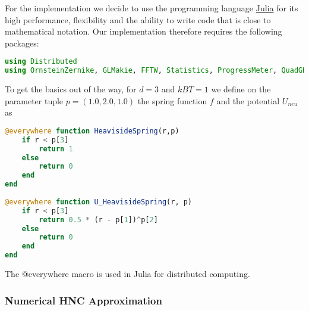 For the implementation we decide to use the programming language \href{https://julialang.org/}{Julia} for its high performance, flexibility and the ability to write code that is close to mathematical notation. Our implementation therefore requires the following packages:
\begin{mdframed}[backgroundcolor=black!4, topline=false, bottomline=false, rightline=false, leftline=false]
    \begin{lstlisting}[language=Julia,basicstyle=\small]
using Distributed
using OrnsteinZernike, GLMakie, FFTW, Statistics, ProgressMeter, QuadGK, NLsolve, ForwardDiff, LinearAlgebra, LoopVectorization, Base.Threads, CSV, DataFrames
    \end{lstlisting}
\end{mdframed}

To get the basics out of the way, for $d = 3$ and $kBT = 1$ we define on the parameter tuple $p = (1.0, 2.0, 1.0)$ the spring function $f$ and the potential $U_{\textit{neu}}$ as 
\begin{mdframed}[backgroundcolor=black!4, topline=false, bottomline=false, rightline=false, leftline=false]
    \begin{lstlisting}[language=Julia,basicstyle=\small]
@everywhere function HeavisideSpring(r,p)
    if r < p[3]
        return 1
    else
        return 0
    end
end
    
@everywhere function U_HeavisideSpring(r, p)
    if r < p[3]
        return 0.5 * (r - p[1])^p[2]
    else
        return 0
    end
end
    \end{lstlisting}
\end{mdframed}
The @everywhere macro is used in Julia for distributed computing.

\subsubsection*{Numerical HNC Approximation}

